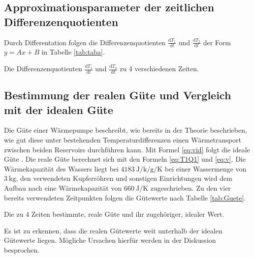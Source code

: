 \subsection{Approximationsparameter der zeitlichen Differenzenquotienten}

Durch Differentation folgen die Differenzenquotienten
$\frac{\text{d}T_1}{\text{d}t}$ und $\frac{\text{d}T_2}{\text{d}t}$ der Form $y = Ax+B$ in Tabelle \ref{tab:taba}.

\begin{table}
  \centering
  \caption{Die Differenzenquotienten $\frac{\text{d}T_1}{\text{d}t}$ und $\frac{\text{d}T_2}{\text{d}t}$ zu 4 verschiedenen Zeiten.}
  \label{tab:Ableitungen}
\end{table}

\subsection{Bestimmung der realen Güte und Vergleich mit der idealen Güte}
Die Güte einer Wärmepumpe beschreibt, wie bereits in der Theorie beschrieben,
wie gut diese unter bestehenden Temperaturdifferenzen einen Wärmetransport zwischen
beiden Reservoirs durchführen kann. Mit Formel \ref{eq:vid} folgt die ideale Güte . Die
reale Güte berechnet sich mit den Formeln \ref{eq:T1Q1} und \ref{eq:v}. Die Wärmekapazität des Wassers
liegt bei $\SI{4183}{\joule\per\kilo\per\gram\per\kelvin}$ bei einer Wassermenge von $\SI{3}{\kilo\gram}$, den verwendeten
Kupferröhren und sonstigen Einrichtungen wird dem Aufbau \cite{V206} nach eine Wärmekapazität von $\SI{660}{\joule\per\kelvin}$ zugeschrieben.
Zu den vier bereits verwendeten Zeitpunkten folgen die Gütewerte nach Tabelle \ref{tab:Guete}.

\begin{table}
  \centering
  \caption{Die zu 4 Zeiten bestimmte, reale Güte und ihr zugehöriger, idealer Wert.}
  \label{tab:Guete}
\end{table}

Es ist zu erkennen, dass die realen Gütewerte weit unterhalb der idealen Gütewerte liegen.
Mögliche Ursachen hierfür werden in der Diskussion besprochen.

